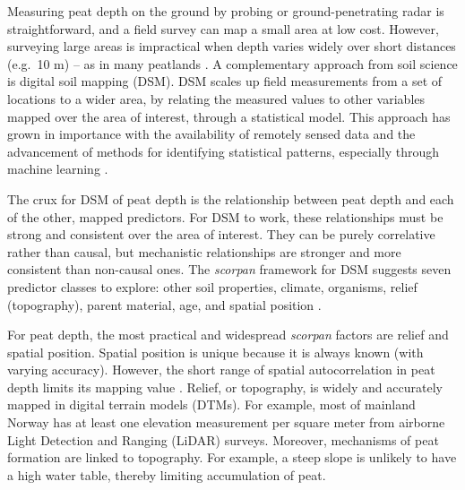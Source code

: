 \documentclass[soil, manuscript]{copernicus}
\begin{document}
Measuring peat depth on the ground by probing or ground-penetrating radar is straightforward, and a field survey can map a small area at low cost.
However, surveying large areas is impractical when depth varies widely over short distances (e.g.~10 m) -- as in many peatlands \citep{torppaStatisticalApproachDetermining2011, proulx-mcinnisReviewGroundpenetratingRadar2013, henrionMappingMonitoringPeatlands2024}.
A complementary approach from soil science is digital soil mapping (DSM).
DSM scales up field measurements from a set of locations to a wider area, by relating the measured values to other variables mapped over the area of interest, through a statistical model.
This approach has grown in importance with the availability of remotely sensed data and the advancement of methods for identifying statistical patterns, especially through machine learning \citep{minasnyDigitalMappingPeatlands2019, wadouxMachineLearningDigital2020}.

The crux for DSM of peat depth is the relationship between peat depth and each of the other, mapped predictors.
For DSM to work, these relationships must be strong and consistent over the area of interest.
They can be purely correlative rather than causal, but mechanistic relationships are stronger and more consistent than non-causal ones.
The \emph{scorpan} framework for DSM suggests seven predictor classes to explore: other soil properties, climate, organisms, relief (topography), parent material, age, and spatial position \citep{mcbratneyDigitalSoilMapping2003}.

For peat depth, the most practical and widespread \emph{scorpan} factors are relief and spatial position.
Spatial position is unique because it is always known (with varying accuracy).
However, the short range of spatial autocorrelation in peat depth limits its mapping value \citep{henglGenericFrameworkSpatial2004}.
Relief, or topography, is widely and accurately mapped in digital terrain models (DTMs).
For example, most of mainland Norway has at least one elevation measurement per square meter from airborne Light Detection and Ranging (LiDAR) surveys.
Moreover, mechanisms of peat formation are linked to topography.
For example, a steep slope is unlikely to have a high water table, thereby limiting accumulation of peat.
\end{document}
